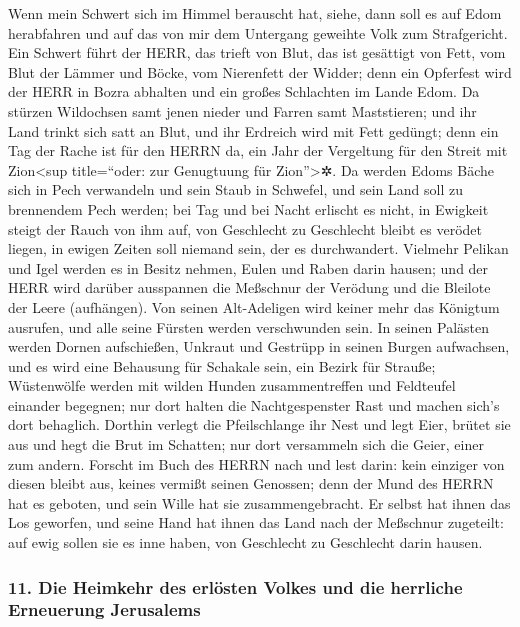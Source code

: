 Wenn mein Schwert sich im Himmel berauscht hat, siehe,
dann soll es auf Edom herabfahren und auf das von mir dem Untergang
geweihte Volk zum Strafgericht. Ein Schwert führt der
HERR, das trieft von Blut, das ist gesättigt von Fett, vom Blut der
Lämmer und Böcke, vom Nierenfett der Widder; denn ein Opferfest wird der
HERR in Bozra abhalten und ein großes Schlachten im Lande Edom.
Da stürzen Wildochsen samt jenen nieder und Farren samt
Maststieren; und ihr Land trinkt sich satt an Blut, und ihr Erdreich
wird mit Fett gedüngt; denn ein Tag der Rache ist für den
HERRN da, ein Jahr der Vergeltung für den Streit mit Zion\textless sup
title=``oder: zur Genugtuung für Zion''\textgreater✲. Da
werden Edoms Bäche sich in Pech verwandeln und sein Staub in Schwefel,
und sein Land soll zu brennendem Pech werden; bei Tag und
bei Nacht erlischt es nicht, in Ewigkeit steigt der Rauch von ihm auf,
von Geschlecht zu Geschlecht bleibt es verödet liegen, in ewigen Zeiten
soll niemand sein, der es durchwandert. Vielmehr Pelikan
und Igel werden es in Besitz nehmen, Eulen und Raben darin hausen; und
der HERR wird darüber ausspannen die Meßschnur der Verödung und die
Bleilote der Leere (aufhängen). Von seinen Alt-Adeligen
wird keiner mehr das Königtum ausrufen, und alle seine Fürsten werden
verschwunden sein. In seinen Palästen werden Dornen
aufschießen, Unkraut und Gestrüpp in seinen Burgen aufwachsen, und es
wird eine Behausung für Schakale sein, ein Bezirk für Strauße;
Wüstenwölfe werden mit wilden Hunden zusammentreffen und
Feldteufel einander begegnen; nur dort halten die Nachtgespenster Rast
und machen sich's dort behaglich. Dorthin verlegt die
Pfeilschlange ihr Nest und legt Eier, brütet sie aus und hegt die Brut
im Schatten; nur dort versammeln sich die Geier, einer zum andern.
Forscht im Buch des HERRN nach und lest darin: kein
einziger von diesen bleibt aus, keines vermißt seinen Genossen; denn der
Mund des HERRN hat es geboten, und sein Wille hat sie zusammengebracht.
Er selbst hat ihnen das Los geworfen, und seine Hand hat
ihnen das Land nach der Meßschnur zugeteilt: auf ewig sollen sie es inne
haben, von Geschlecht zu Geschlecht darin hausen.

\hypertarget{die-heimkehr-des-erluxf6sten-volkes-und-die-herrliche-erneuerung-jerusalems}{%
\subsubsection{11. Die Heimkehr des erlösten Volkes und die herrliche
Erneuerung
Jerusalems}\label{die-heimkehr-des-erluxf6sten-volkes-und-die-herrliche-erneuerung-jerusalems}}

